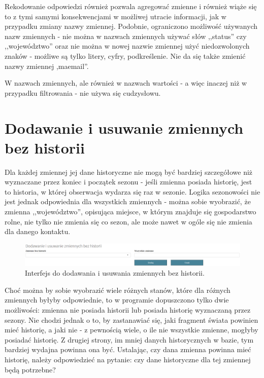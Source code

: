 \documentclass[12pt, twoside, hidelinks]{report}
\begin{document}
Rekodowanie odpowiedzi również pozwala agregować zmienne i również wiąże się to z tymi samymi konsekwencjami w możliwej utracie informacji, jak w przypadku zmiany nazwy zmiennej. Podobnie, ograniczono możliwość używanych nazw zmiennych - nie można w nazwach zmiennych używać słów ,,status'' czy ,,województwo'' oraz nie można w nowej nazwie zmiennej użyć niedozwolonych znaków - możliwe są tylko litery, cyfry, podkreślenie. Nie da się także zmienić nazwy zmiennej ,ma\textunderscore email''. \par
W nazwach zmiennych, ale również w nazwach wartości - a więc inaczej niż w przypadku filtrowania - nie używa się cudzysłowu.
\section{Dodawanie i usuwanie zmiennych bez historii}
Dla każdej zmiennej jej dane historyczne nie mogą być bardziej szczegółowe niż wyznaczane przez koniec i początek sezonu - jeśli zmienna posiada historię, jest to historia, w której obserwacja wydarza się raz w sezonie. Logika sezonowości nie jest jednak odpowiednia dla wszystkich zmiennych - można sobie wyobrazić, że zmienna ,,województwo'', opisująca miejsce, w którym znajduje się gospodarstwo rolne, nie tylko nie zmienia się co sezon, ale może nawet w ogóle się nie zmienia dla danego kontaktu. \par
 \begin{figure}[h!]
\includegraphics[width = 1\textwidth]{3.4.}
\caption{Interfejs do dodawania i usuwania zmiennych bez historii.}
\label{dodawanie_usuwanie_zmiennych_bez_historii_interfejs}
\end{figure}
Choć można by sobie wyobrazić wiele różnych stanów, które dla różnych zmiennych byłyby odpowiednie, to w programie dopuszczono tylko dwie możliwości: zmienna nie posiada historii lub posiada historię wyznaczaną przez sezony. Nie chodzi jednak o to, by zastanawiać się, jaki fragment świata powinien mieć historię, a jaki nie - z pewnością wiele, o ile nie wszystkie zmienne, mogłyby posiadać historię. Z drugiej strony, im mniej danych historycznych w bazie, tym bardziej wydajna powinna ona być. Ustalając, czy dana zmienna powinna mieć historię, należy odpowiedzieć na pytanie: czy dane historyczne dla tej zmiennej będą potrzebne? \par
\end{document}
